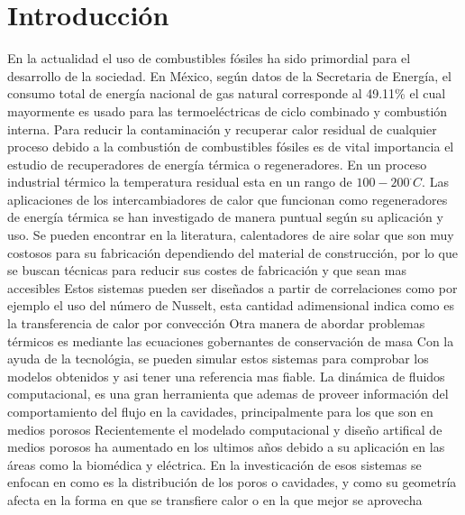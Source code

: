 
\chapter{Introducción}

En la actualidad el uso de combustibles f\'osiles ha sido primordial para el desarrollo de la sociedad. En M\'exico, según datos de la Secretaria de Energ\'ia, el consumo total de energ\'ia nacional de gas natural corresponde al 49.11\% el cual mayormente es usado para las termoeléctricas de ciclo combinado y combusti\'on interna\cite{BNE2021}. Para reducir la contaminaci\'on y recuperar calor residual de cualquier proceso debido a la combustión de combustibles fósiles es de vital importancia el estudio de recuperadores de energ\'ia t\'ermica o regeneradores. En un proceso industrial t\'ermico la temperatura residual esta en un rango de $100-200 ^\cdot C$\cite{Anish2021}. 
\newline
Las aplicaciones de los intercambiadores de calor que funcionan como regeneradores de energ\'ia t\'ermica se han investigado de manera puntual según su aplicaci\'on y uso. Se pueden encontrar en la literatura, calentadores de aire solar que son muy costosos para su fabricaci\'on dependiendo del material de construcci\'on, por lo que se buscan técnicas para reducir sus costes de fabricaci\'on y que sean mas accesibles%
\newline
Estos sistemas pueden ser dise\~nados a partir de correlaciones como por ejemplo el uso del n\'umero de Nusselt, esta cantidad adimensional indica como es la transferencia de calor por convecci\'on%
\newline
Otra manera de abordar problemas t\'ermicos es mediante las ecuaciones gobernantes de conservaci\'on de masa%
Con la ayuda de la tecnol\'ogia, se pueden simular estos sistemas para comprobar los modelos obtenidos y asi tener una referencia mas fiable. La din\'amica de fluidos computacional, es una gran herramienta que ademas de proveer informaci\'on del comportamiento del flujo en la cavidades, principalmente para los que son en medios porosos%
\newline
Recientemente el modelado computacional y dise\~no artifical de medios porosos ha aumentado en los ultimos a\~nos debido a su aplicaci\'on en las \'areas como la biom\'edica y el\'ectrica. En la investicaci\'on de esos sistemas se enfocan en como es la distribución de los poros o cavidades, y como su geometría afecta en la forma en que se transfiere calor o en la que mejor se aprovecha%
\newline

